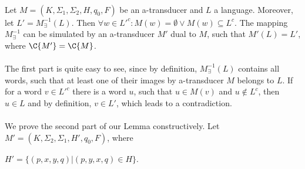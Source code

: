\paragraph{}
\clema Let $M = (K, \Sigma_1, \Sigma_2, H, q_0, F)$ be an a-transducer and $L$ a language. Moreover, let $L' = M_{\exists}^{-1}(L)$. Then $\forall w \in L'^c: M(w) = \emptyset \vee M(w) \subseteq L^c$. The mapping $M_{\exists}^{-1}$ can be simulated by an a-transducer $M'$ dual to $M$, such that $M'(L) = L'$, where $\C{M'} = \C{M}$.

\paragraph{}
\dokaz The first part is quite easy to see, since by definition, $M_{\exists}^{-1}(L)$ contains all words, such that at least one of their images by a-transducer $M$ belongs to $L$. If for a word $v \in L'^c$ there is a word $u$, such that $u \in M(v)$ and $u \notin L^c$, then $u \in L$ and by definition, $v \in L'$, which leads to a contradiction.

\paragraph{}
We prove the second part of our Lemma constructively. Let $M' = (K, \Sigma_2, \Sigma_1, H', q_0, F)$, where\\
\centerline{$H'=\{(p,x,y,q)|(p,y,x,q) \in H\}$.} 

